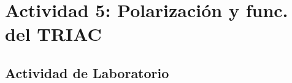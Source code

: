 \newpage

\section{Actividad 5: Polarización y func. del TRIAC}

\subsection{Actividad de Laboratorio}